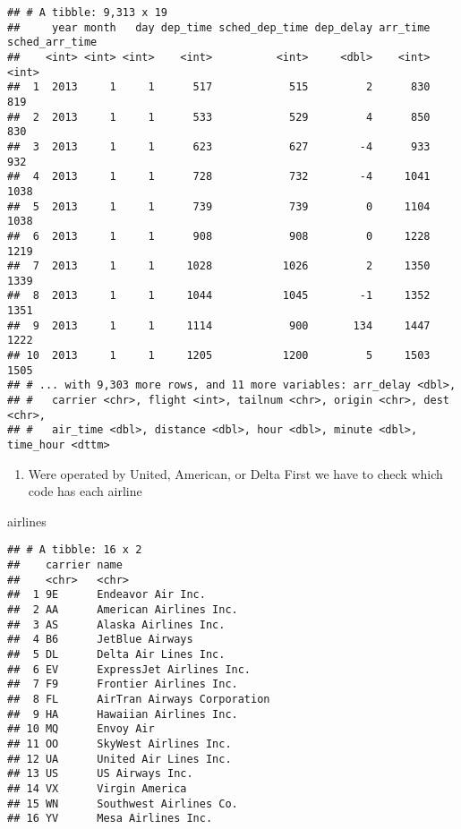 \documentclass[
]{article}
\newenvironment{Shaded}{\begin{snugshade}}{\end{snugshade}}
\newcommand{\NormalTok}[1]{#1}
\providecommand{\tightlist}{%
  \setlength{\itemsep}{0pt}\setlength{\parskip}{0pt}}
\begin{document}
\begin{verbatim}
## # A tibble: 9,313 x 19
##     year month   day dep_time sched_dep_time dep_delay arr_time sched_arr_time
##    <int> <int> <int>    <int>          <int>     <dbl>    <int>          <int>
##  1  2013     1     1      517            515         2      830            819
##  2  2013     1     1      533            529         4      850            830
##  3  2013     1     1      623            627        -4      933            932
##  4  2013     1     1      728            732        -4     1041           1038
##  5  2013     1     1      739            739         0     1104           1038
##  6  2013     1     1      908            908         0     1228           1219
##  7  2013     1     1     1028           1026         2     1350           1339
##  8  2013     1     1     1044           1045        -1     1352           1351
##  9  2013     1     1     1114            900       134     1447           1222
## 10  2013     1     1     1205           1200         5     1503           1505
## # ... with 9,303 more rows, and 11 more variables: arr_delay <dbl>,
## #   carrier <chr>, flight <int>, tailnum <chr>, origin <chr>, dest <chr>,
## #   air_time <dbl>, distance <dbl>, hour <dbl>, minute <dbl>, time_hour <dttm>
\end{verbatim}

\begin{enumerate}
\def\labelenumi{\arabic{enumi}.}
\setcounter{enumi}{2}
\tightlist
\item
  Were operated by United, American, or Delta First we have to check
  which code has each airline
\end{enumerate}

\begin{Shaded}
\begin{Highlighting}[]
\NormalTok{airlines}
\end{Highlighting}
\end{Shaded}

\begin{verbatim}
## # A tibble: 16 x 2
##    carrier name                       
##    <chr>   <chr>                      
##  1 9E      Endeavor Air Inc.          
##  2 AA      American Airlines Inc.     
##  3 AS      Alaska Airlines Inc.       
##  4 B6      JetBlue Airways            
##  5 DL      Delta Air Lines Inc.       
##  6 EV      ExpressJet Airlines Inc.   
##  7 F9      Frontier Airlines Inc.     
##  8 FL      AirTran Airways Corporation
##  9 HA      Hawaiian Airlines Inc.     
## 10 MQ      Envoy Air                  
## 11 OO      SkyWest Airlines Inc.      
## 12 UA      United Air Lines Inc.      
## 13 US      US Airways Inc.            
## 14 VX      Virgin America             
## 15 WN      Southwest Airlines Co.     
## 16 YV      Mesa Airlines Inc.
\end{verbatim}
\end{document}
